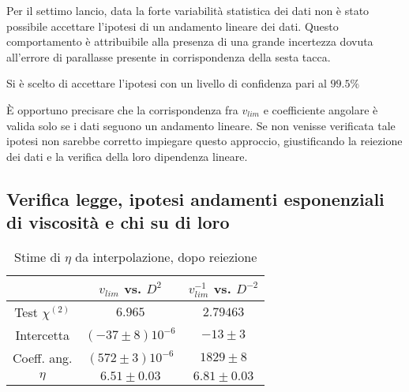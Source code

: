 \documentclass[a4paper,11pt,oneside]{article}
\begin{document}
Per il settimo lancio, data la forte variabilità statistica dei dati non è stato possibile accettare l'ipotesi di un andamento lineare dei dati. Questo comportamento è attribuibile alla presenza di una grande incertezza dovuta all'errore di parallasse presente in corrispondenza della sesta tacca.

Si è scelto di accettare l'ipotesi con un livello di confidenza pari al $99.5\%$

È opportuno precisare che la corrispondenza fra $v_{lim}$ e coefficiente angolare è valida solo se i dati seguono un andamento lineare. Se non venisse verificata tale ipotesi non sarebbe corretto impiegare questo approccio, giustificando la reiezione dei dati e la verifica della loro dipendenza lineare.


\subsection{Verifica legge, ipotesi andamenti esponenziali di viscosità e chi su di loro} 


\begin{table}[h!]
    \centering
    \begin{tabular}{|c|c|c|}
        \hline
        &$v_{lim}$ vs. $D^{2}$ &$v_{lim}^{-1}$ vs. $D^{-2}$ \\\hline
        \rowcolor[rgb]{0.85,0.85,0.85}Test $\chi^{(2)}$ & $6.965$ & $ 2.79463$\\\hline
        Intercetta & $(-37 \pm 8)10^{-6}$& $ -13 \pm 3$\\\hline
        \rowcolor[rgb]{0.85,0.85,0.85}Coeff. ang. & $(572 \pm 3)10^{-6}$& $ 1829 \pm 8$\\\hline
        $\eta$ & $6.51 \pm 0.03$& $ 6.81 \pm 0.03$\\\hline
        \end{tabular}
    \caption{Stime di $\eta$ da interpolazione, dopo reiezione}
    \label{tab:eta_interpolazione}
\end{table}
\end{document}
